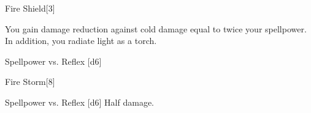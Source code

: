 \begin{spellsection}{Fire Shield}[3]
    \begin{spellheader}
    \end{spellheader}
    \begin{spellcontent}
        \begin{spelleffects}
            \spelleffect You gain damage reduction against cold damage equal to twice your spellpower. In addition, you radiate light as a torch.
            \spelldur \durshort \dismissable
        \end{spelleffects}
    \end{spellcontent}
    \begin{spellsubcontent}
        \begin{spelltargetinginfo}
        \end{spelltargetinginfo}
        \begin{spelleffects}
            \begin{spellattack}{Spellpower vs. Reflex}
                \spellsuccess {}[d6]
            \end{spellattack}
        \end{spelleffects}
    \end{spellsubcontent}
    \begin{spellfooter}
        \miscastexplode
    \end{spellfooter}
\end{spellsection}

\begin{spellsection}{Fire Storm}[8]
    \begin{spellheader}
    \end{spellheader}
    \begin{spellcontent}
        \begin{spelltargetinginfo}
        \end{spelltargetinginfo}
        \begin{spelleffects}
            \begin{spellattack}{Spellpower vs. Reflex}
                \spellsuccess {}[d6]
                \spellfailure Half damage.
            \end{spellattack}
        \end{spelleffects}
    \end{spellcontent}
    \begin{spellfooter}
        \miscastyou
    \end{spellfooter}
\end{spellsection}

